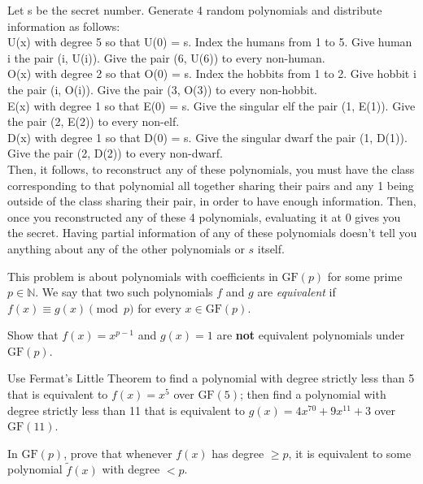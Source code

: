 \documentclass[11pt]{article}
\begin{document}
\begin{solution}
Let s be the secret number. 
Generate 4 random polynomials and distribute information as follows: 
\\U(x) with degree 5 so that U(0) = s. Index the humans from 1 to 5. Give human i the pair (i, U(i)). Give the pair (6, U(6)) to every non-human.
\\O(x) with degree 2 so that O(0) = s. Index the hobbits from 1 to 2. Give hobbit i the pair (i, O(i)). Give the pair (3, O(3)) to every non-hobbit.
\\E(x) with degree 1 so that E(0) = s. Give the singular elf the pair (1, E(1)). Give the pair (2, E(2)) to every non-elf.
\\D(x) with degree 1 so that D(0) = s. Give the singular dwarf the pair (1, D(1)). Give the pair (2, D(2)) to every non-dwarf.
\\Then, it follows, to reconstruct any of these polynomials,
you must have the class corresponding to that polynomial all together sharing their pairs
and any 1 being outside of the class sharing their pair, in order to have enough information.
Then, once you reconstructed any of these 4 polynomials, evaluating it at 0 gives you the secret.
Having partial information of any of these polynomials doesn't tell you anything about any of the other polynomials or $s$ itself.
\end{solution}\newpage


This problem is about polynomials with coefficients in $\text{GF}(p)$ for some prime $p \in \mathbb{N}$. We say that two such polynomials $f$ and $g$ are \emph{equivalent} if $f(x) \equiv g(x) \pmod{p}$ for every $x \in \text{GF}(p)$. 

\begin{Parts}
    \Part Show that $f(x)=x^{p-1}$ and $g(x)=1$ are \textbf{not} equivalent polynomials under $\text{GF}(p).$

    \Part Use Fermat's Little Theorem to find a polynomial with degree strictly less than 5 that is equivalent to $f(x) = x^5$ over $\text{GF}(5)$; then find a polynomial with degree strictly less than 11 that is equivalent to $g(x) = 4x^{70} + 9x^{11} + 3$ over $\text{GF}(11)$.

    \Part In $\mathrm{GF}(p)$, prove that whenever $f(x)$ has degree $\ge p$, it is equivalent to some polynomial $\tilde f(x)$ with degree $< p$.
\end{Parts}
\end{document}
